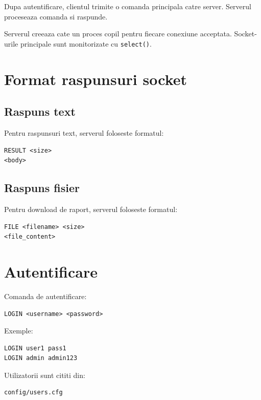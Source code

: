\documentclass[12pt,a4paper]{article}
\begin{document}
Dupa autentificare, clientul trimite o comanda principala catre server. Serverul proceseaza comanda si raspunde.

Serverul creeaza cate un proces copil pentru fiecare conexiune acceptata. Socket-urile principale sunt monitorizate cu \texttt{select()}.

\section{Format raspunsuri socket}

\subsection{Raspuns text}

Pentru raspunsuri text, serverul foloseste formatul:

\begin{lstlisting}[style=code]
RESULT <size>
<body>
\end{lstlisting}

\subsection{Raspuns fisier}

Pentru download de raport, serverul foloseste formatul:

\begin{lstlisting}[style=code]
FILE <filename> <size>
<file_content>
\end{lstlisting}

\section{Autentificare}

Comanda de autentificare:

\begin{lstlisting}[style=code]
LOGIN <username> <password>
\end{lstlisting}

Exemple:

\begin{lstlisting}[style=code]
LOGIN user1 pass1
LOGIN admin admin123
\end{lstlisting}

Utilizatorii sunt cititi din:

\begin{lstlisting}[style=code]
config/users.cfg
\end{lstlisting}
\end{document}
